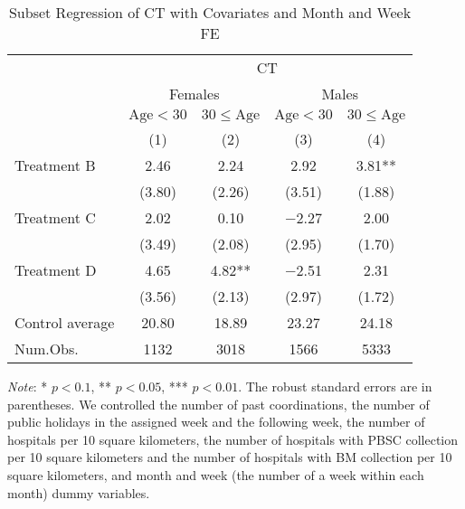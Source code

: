 \documentclass[12pt, a4paper]{article}
\begin{document}
\begin{table}[H]

\caption{\label{tab:test-lm-subset2}Subset Regression of CT with Covariates and Month and Week FE}
\centering
\fontsize{8}{10}\selectfont
\begin{threeparttable}
\begin{tabular}[t]{lcccc}
\toprule
\multicolumn{1}{c}{ } & \multicolumn{4}{c}{CT} \\
\cmidrule(l{3pt}r{3pt}){2-5}
\multicolumn{1}{c}{ } & \multicolumn{2}{c}{Females} & \multicolumn{2}{c}{Males} \\
\cmidrule(l{3pt}r{3pt}){2-3} \cmidrule(l{3pt}r{3pt}){4-5}
\multicolumn{1}{c}{ } & \multicolumn{1}{c}{$\text{Age} < 30$} & \multicolumn{1}{c}{$30 \le \text{Age}$} & \multicolumn{1}{c}{$\text{Age} < 30$} & \multicolumn{1}{c}{$30 \le \text{Age}$} \\
\cmidrule(l{3pt}r{3pt}){2-2} \cmidrule(l{3pt}r{3pt}){3-3} \cmidrule(l{3pt}r{3pt}){4-4} \cmidrule(l{3pt}r{3pt}){5-5}
  & (1) & (2) & (3) & (4)\\
\midrule
Treatment B & \num{2.46} & \num{2.24} & \num{2.92} & \num{3.81}**\\
 & (\num{3.80}) & (\num{2.26}) & (\num{3.51}) & (\num{1.88})\\
Treatment C & \num{2.02} & \num{0.10} & \num{-2.27} & \num{2.00}\\
 & (\num{3.49}) & (\num{2.08}) & (\num{2.95}) & (\num{1.70})\\
Treatment D & \num{4.65} & \num{4.82}** & \num{-2.51} & \num{2.31}\\
 & (\num{3.56}) & (\num{2.13}) & (\num{2.97}) & (\num{1.72})\\
\midrule
Control average & 20.80 & 18.89 & 23.27 & 24.18\\
Num.Obs. & \num{1132} & \num{3018} & \num{1566} & \num{5333}\\
\bottomrule
\end{tabular}
\begin{tablenotes}
\item \emph{Note}: * $p < 0.1$, ** $p < 0.05$, *** $p < 0.01$. The robust standard errors are in parentheses. We controlled the number of past coordinations, the number of public holidays in the assigned week and the following week, the number of hospitals per 10 square kilometers, the number of hospitals with PBSC collection per 10 square kilometers and the number of hospitals with BM collection per 10 square kilometers, and month and week (the number of a week within each month) dummy variables.
\end{tablenotes}
\end{threeparttable}
\end{table}
\end{document}
